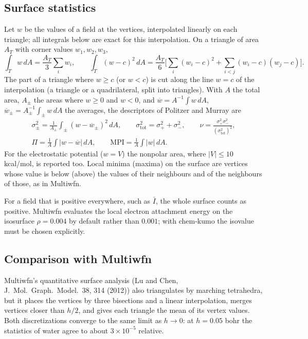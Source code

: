 \documentclass[11pt,a4paper]{article}
\begin{document}
\subsection{Surface statistics}
Let $w$ be the values of a field at the vertices, interpolated linearly on
each triangle; all integrals below are exact for this interpolation. On a
triangle of area $A_T$ with corner values $w_1,w_2,w_3$,
\begin{equation}
 \int_T w\,dA=\frac{A_T}3\sum_iw_i,\qquad
 \int_T (w-c)^2\,dA=\frac{A_T}6\Big[\sum_i(w_i-c)^2+\sum_{i<j}(w_i-c)(w_j-c)\Big].
\end{equation}
The part of a triangle where $w\ge c$ (or $w<c$) is cut along the line
$w=c$ of the interpolation (a triangle or a quadrilateral, split into
triangles). With $A$ the total area, $A_\pm$ the areas where $w\ge0$ and
$w<0$, and $\overline w=A^{-1}\int w\,dA$,
$\overline w_\pm=A_\pm^{-1}\int_\pm w\,dA$ the averages, the descriptors of
Politzer and Murray are
\begin{gather}
 \sigma_\pm^2=\frac1{A_\pm}\int_\pm(w-\overline w_\pm)^2\,dA,\qquad
 \sigma_{\mathrm{tot}}^2=\sigma_+^2+\sigma_-^2,\qquad
 \nu=\frac{\sigma_+^2\sigma_-^2}{(\sigma_{\mathrm{tot}}^2)^2},\\
 \Pi=\frac1A\int|w-\overline w|\,dA,\qquad
 \mathrm{MPI}=\frac1A\int|w|\,dA .
\end{gather}
For the electrostatic potential ($w=V$) the nonpolar area, where
$|V|\le10$ kcal/mol, is reported too. Local minima (maxima) on the surface
are vertices whose value is below (above) the values of their neighbours
and of the neighbours of those, as in Multiwfn.

For a field that is positive everywhere, such as $\bar I$, the whole
surface counts as positive. Multiwfn evaluates the local electron
attachment energy on the isosurface $\rho=0.004$ by default rather than
$0.001$; with chem-kumo the isovalue must be chosen explicitly.

\subsection{Comparison with Multiwfn}
Multiwfn's quantitative surface analysis (Lu and Chen, J.\ Mol.\ Graph.\
Model.\ 38, 314 (2012)) also triangulates by marching tetrahedra, but it
places the vertices by three bisections and a linear interpolation, merges
vertices closer than $h/2$, and gives each triangle the mean of its vertex
values. Both discretizations converge to the same limit as $h\to0$: at
$h=0.05$ bohr the statistics of water agree to about $3\times10^{-5}$
relative.
\end{document}
